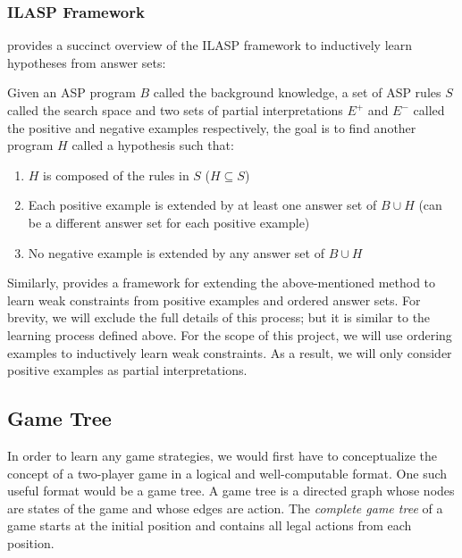 
\subsubsection{ILASP Framework}

\justify
\citet{law2017inductive} provides a succinct overview of the ILASP framework to inductively learn hypotheses from answer sets:

\begin{displayquote}
Given an ASP program $B$ called the background knowledge, a set of ASP rules $S$ called the search space and two sets of partial interpretations $E^{+}$ and $E^-$ called the positive and negative examples respectively, the goal is to find another program $H$ called a hypothesis such that:
\begin{enumerate}
    \item $H$ is composed of the rules in $S$ ($H \subseteq S$)
    \item Each positive example is extended by at least one answer set of $B \cup H$ (can be a different answer set for each positive example)
    \item No negative example is extended by any answer set of $B \cup H$
\end{enumerate}
\end{displayquote}

\justify
Similarly, \citet{law2017inductive} provides a framework for extending the above-mentioned method to learn weak constraints from positive examples and ordered answer sets. For brevity, we will exclude the full details of this process; but it is similar to the learning process defined above. For the scope of this project, we will use ordering examples to inductively learn weak constraints. As a result, we will only consider positive examples as partial interpretations.


\subsection{Game Tree}

In order to learn any game strategies, we would first have to conceptualize the concept of a two-player game in a logical and well-computable format. One such useful format would be a game tree. A game tree is a directed graph whose nodes are states of the game and whose edges are action.
The \textit{complete game tree} of a game starts at the initial position and contains all legal actions from each position. 

